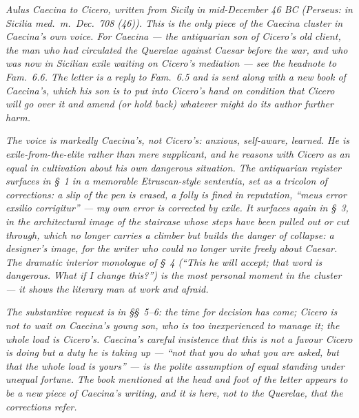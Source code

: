 
\textit{Aulus Caecina to Cicero, written from Sicily in
mid-December 46 BC (Perseus: \textit{in Sicilia med.~m.~Dec.~708
(46)}). This is the only piece of the Caecina cluster in
Caecina's own voice. For Caecina --- the antiquarian son of
Cicero's old client, the man who had circulated the
\textit{Querelae} against Caesar before the war, and who was now
in Sicilian exile waiting on Cicero's mediation --- see the
headnote to \textit{Fam.}~6.6. The letter is a reply to
\textit{Fam.}~6.5 and is sent along with a new book of Caecina's,
which his son is to put into Cicero's hand on condition that
Cicero will go over it and amend (or hold back) whatever might
do its author further harm.}

\textit{The voice is markedly Caecina's, not Cicero's: anxious,
self-aware, learned. He is exile-from-the-elite rather than
mere supplicant, and he reasons with Cicero as an equal in
cultivation about his own dangerous situation. The
antiquarian register surfaces in \S~1 in a memorable Etruscan-style
sententia, set as a tricolon of corrections: a slip of the pen
is erased, a folly is fined in reputation, ``\textit{meus error
exsilio corrigitur}'' --- my own error is corrected by exile. It
surfaces again in \S~3, in the architectural image of the
staircase whose steps have been pulled out or cut through, which
no longer carries a climber but builds the danger of collapse:
a designer's image, for the writer who could no longer write
freely about Caesar. The dramatic interior monologue of \S~4
(``This he will accept; that word is dangerous. What if I change
this?'') is the most personal moment in the cluster --- it shows
the literary man at work and afraid.}

\textit{The substantive request is in \S\S~5--6: the time for
decision has come; Cicero is not to wait on Caecina's young son,
who is too inexperienced to manage it; the whole load is
Cicero's. Caecina's careful insistence that this is not a
favour Cicero is doing but a duty he is taking up --- ``not that
you do what you are asked, but that the whole load is yours''
--- is the polite assumption of equal standing under unequal
fortune. The book mentioned at the head and foot of the letter
appears to be a new piece of Caecina's writing, and it is here,
not to the \textit{Querelae}, that the corrections refer.}

